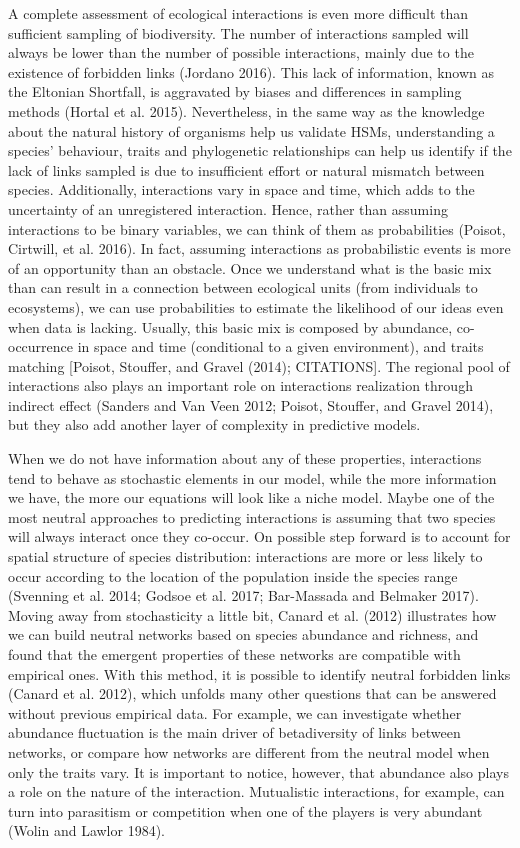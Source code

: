 \documentclass[12pt]{article}
\begin{document}
A complete assessment of ecological interactions is even more difficult
than sufficient sampling of biodiversity. The number of interactions
sampled will always be lower than the number of possible interactions,
mainly due to the existence of forbidden links (Jordano 2016). This lack
of information, known as the Eltonian Shortfall, is aggravated by biases
and differences in sampling methods (Hortal et al. 2015). Nevertheless,
in the same way as the knowledge about the natural history of organisms
help us validate HSMs, understanding a species' behaviour, traits and
phylogenetic relationships can help us identify if the lack of links
sampled is due to insufficient effort or natural mismatch between
species. Additionally, interactions vary in space and time, which adds
to the uncertainty of an unregistered interaction. Hence, rather than
assuming interactions to be binary variables, we can think of them as
probabilities (Poisot, Cirtwill, et al. 2016). In fact, assuming
interactions as probabilistic events is more of an opportunity than an
obstacle. Once we understand what is the basic mix than can result in a
connection between ecological units (from individuals to ecosystems), we
can use probabilities to estimate the likelihood of our ideas even when
data is lacking. Usually, this basic mix is composed by abundance,
co-occurrence in space and time (conditional to a given environment),
and traits matching {[}Poisot, Stouffer, and Gravel (2014);
CITATIONS{]}. The regional pool of interactions also plays an important
role on interactions realization through indirect effect (Sanders and
Van Veen 2012; Poisot, Stouffer, and Gravel 2014), but they also add
another layer of complexity in predictive models.

When we do not have information about any of these properties,
interactions tend to behave as stochastic elements in our model, while
the more information we have, the more our equations will look like a
niche model. Maybe one of the most neutral approaches to predicting
interactions is assuming that two species will always interact once they
co-occur. On possible step forward is to account for spatial structure
of species distribution: interactions are more or less likely to occur
according to the location of the population inside the species range
(Svenning et al. 2014; Godsoe et al. 2017; Bar-Massada and Belmaker
2017). Moving away from stochasticity a little bit, Canard et al. (2012)
illustrates how we can build neutral networks based on species abundance
and richness, and found that the emergent properties of these networks
are compatible with empirical ones. With this method, it is possible to
identify neutral forbidden links (Canard et al. 2012), which unfolds
many other questions that can be answered without previous empirical
data. For example, we can investigate whether abundance fluctuation is
the main driver of betadiversity of links between networks, or compare
how networks are different from the neutral model when only the traits
vary. It is important to notice, however, that abundance also plays a
role on the nature of the interaction. Mutualistic interactions, for
example, can turn into parasitism or competition when one of the players
is very abundant (Wolin and Lawlor 1984).
\end{document}
